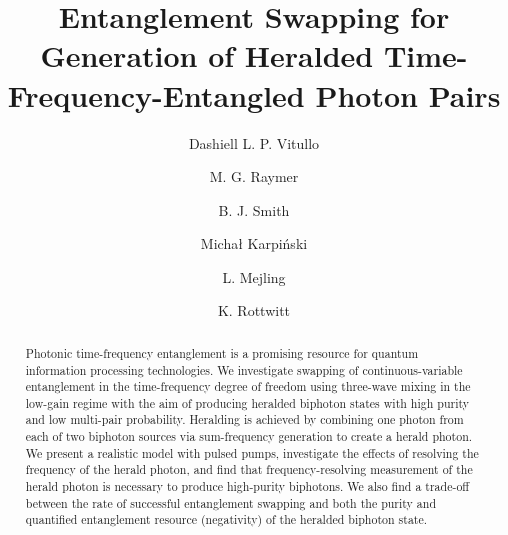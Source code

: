 \documentclass[twocolumn,amssymb, nobibnotes, showpacs, aps, pra,10pt]{revtex4-1}
\begin{document}
\title{Entanglement Swapping for Generation of Heralded Time-Frequency-Entangled Photon Pairs}

\author{Dashiell L. P. Vitullo}

\author{M. G. Raymer}

\author{B. J. Smith}

\author{Micha\l{} Karpi\'nski}

\author{L. Mejling}
\author{K. Rottwitt}

\begin{abstract}
Photonic time-frequency entanglement is a promising resource for quantum information processing technologies. We investigate swapping of continuous-variable entanglement in the time-frequency degree of freedom using three-wave mixing in the low-gain regime with the aim of producing heralded biphoton states with high purity and low multi-pair probability. Heralding is achieved by combining one photon from each of two biphoton sources via sum-frequency generation to create a herald photon. We present a realistic model with pulsed pumps, investigate the effects of resolving the frequency of the herald photon, and find that frequency-resolving measurement of the herald photon is necessary to produce high-purity biphotons. We also find a trade-off between the rate of successful entanglement swapping and both the purity and quantified entanglement resource (negativity) of the heralded biphoton state. 
\end{abstract}


\end{document}
